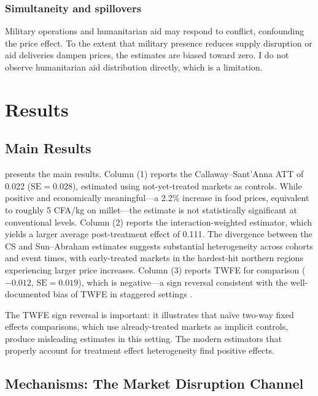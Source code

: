 \documentclass[12pt]{article}
\begin{document}
\subsubsection*{Simultaneity and spillovers} Military operations and humanitarian aid may respond to conflict, confounding the price effect. To the extent that military presence reduces supply disruption or aid deliveries dampen prices, the estimates are biased toward zero. I do not observe humanitarian aid distribution directly, which is a limitation.


\section{Results}

\subsection{Main Results}



 presents the main results. Column (1) reports the Callaway--Sant'Anna ATT of 0.022 ($\text{SE} = 0.028$), estimated using not-yet-treated markets as controls. While positive and economically meaningful---a 2.2\% increase in food prices, equivalent to roughly 5 CFA/kg on millet---the estimate is not statistically significant at conventional levels. Column (2) reports the \citet{sun2021estimating} interaction-weighted estimator, which yields a larger average post-treatment effect of 0.111. The divergence between the CS and Sun--Abraham estimates suggests substantial heterogeneity across cohorts and event times, with early-treated markets in the hardest-hit northern regions experiencing larger price increases. Column (3) reports TWFE for comparison ($-0.012$, $\text{SE} = 0.019$), which is negative---a sign reversal consistent with the well-documented bias of TWFE in staggered settings \citep{goodmanbacon2021difference}.

The TWFE sign reversal is important: it illustrates that na\"ive two-way fixed effects comparisons, which use already-treated markets as implicit controls, produce misleading estimates in this setting. The modern estimators that properly account for treatment effect heterogeneity find positive effects.

\subsection{Mechanisms: The Market Disruption Channel}
\end{document}

